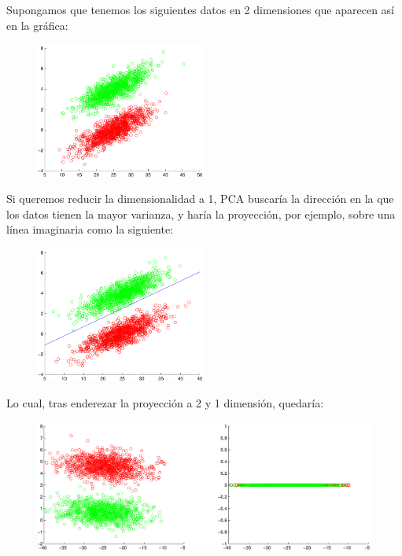 \documentclass[11pt]{scrartcl}
\begin{document}
Supongamos que tenemos los siguientes datos en 2 dimensiones que aparecen así en
la gráfica:

\begin{figure}[h!]
  \centering
  \includegraphics[width=0.5\textwidth]{img/pca_1}
\end{figure}

Si queremos reducir la dimensionalidad a 1, PCA buscaría la dirección en la que
los datos tienen la mayor varianza, y haría la proyección, por ejemplo, sobre
una línea imaginaria como la siguiente:

\begin{figure}[h!]
  \centering
  \includegraphics[width=0.5\textwidth]{img/pca_2}
\end{figure}

Lo cual, tras enderezar la proyección a 2 y 1 dimensión, quedaría:

\begin{figure}[h!]
  \centering
  \includegraphics[width=\textwidth]{img/pca_3}
\end{figure}
\end{document}
